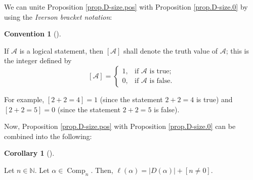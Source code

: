 \documentclass[numbers=enddot,12pt,final,onecolumn,notitlepage]{scrartcl}%
\theoremstyle{definition}
\newtheorem{coro}[theo]{Corollary}
\newenvironment{corollary}[1][]
{\begin{coro}[#1]\begin{leftbar}}
{\end{leftbar}\end{coro}}
\newtheorem{conv}[theo]{Convention}
\newenvironment{convention}[1][]
{\begin{conv}[#1]\begin{leftbar}}
{\end{leftbar}\end{conv}}
\begin{document}
We can unite Proposition \ref{prop.D-size.pos} with Proposition
\ref{prop.D-size.0} by using the \emph{Iverson bracket notation}:

\begin{convention}
\label{conv.iverson}If $\mathcal{A}$ is a logical statement, then $\left[
\mathcal{A}\right]  $ shall denote the truth value of $\mathcal{A}$; this is
the integer defined by%
\[
\left[  \mathcal{A}\right]  =%
\begin{cases}
1, & \text{if }\mathcal{A}\text{ is true;}\\
0, & \text{if }\mathcal{A}\text{ is false.}%
\end{cases}
\]


For example, $\left[  2+2=4\right]  =1$ (since the statement $2+2=4$ is true)
and $\left[  2+2=5\right]  =0$ (since the statement $2+2=5$ is false).
\end{convention}

Now, Proposition \ref{prop.D-size.pos} with Proposition \ref{prop.D-size.0}
can be combined into the following:

\begin{corollary}
\label{cor.D-size.1}Let $n\in\mathbb{N}$. Let $\alpha\in\operatorname*{Comp}%
\nolimits_{n}$. Then, $\ell\left(  \alpha\right)  =\left\vert D\left(
\alpha\right)  \right\vert +\left[  n\neq0\right]  $.
\end{corollary}
\end{document}
